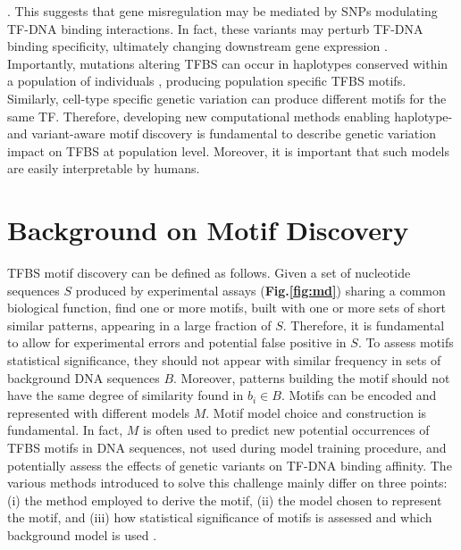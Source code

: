 \documentclass[a4paper, titlepage, openright]{book}
\newcommand{\mychapter}[2]{
    \setcounter{chapter}{#1}
    \setcounter{section}{0}
    \chapter*{#2}
    \addcontentsline{toc}{chapter}{#2}
}
\begin{document}
\citep{maurano2012systematic}. This suggests that gene misregulation may be mediated by SNPs modulating TF-DNA binding interactions. In fact, these variants may perturb TF-DNA binding specificity, ultimately changing downstream gene expression \citep{deplancke2016genetics}. Importantly, mutations altering TFBS can occur in haplotypes conserved within a population of individuals \citep{kasowski2010variation}, producing population specific TFBS motifs. Similarly, cell-type specific genetic variation can produce different motifs for the same TF. Therefore, developing new computational methods enabling haplotype- and variant-aware motif discovery is fundamental to describe genetic variation impact on TFBS at population level. Moreover, it is important that such models are easily interpretable by humans.
\mychapter{2}{Background on Motif Discovery}
TFBS motif discovery can be defined as follows. Given a set of nucleotide sequences $S$ produced by experimental assays (\textbf{Fig.\ref{fig:md}}) sharing a common biological function, find one or more motifs, built with one or more sets of short similar patterns, appearing in a large fraction of $S$. Therefore, it is fundamental to allow for experimental errors and potential false positive in $S$. To assess motifs statistical significance, they should not appear with similar frequency in sets of background DNA sequences $B$. Moreover, patterns building the motif should not have the same degree of similarity found in $b_{i} \in B$. Motifs can be encoded and represented with different models $M$. Motif model choice and construction is fundamental. In fact, $M$ is often used to predict new potential occurrences of TFBS motifs in DNA sequences, not used during model training procedure, and potentially assess the effects of genetic variants on TF-DNA binding affinity. The various methods introduced to solve this challenge mainly differ on three points: (i) the method employed to derive the motif, (ii) the model chosen to represent the motif, and (iii) how statistical significance of motifs is assessed and which background model is used \citep{zambelli2013motif}.
\end{document}
